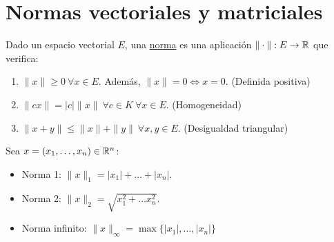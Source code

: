 \section{Normas vectoriales y matriciales}
\begin{definicion}[Norma]
    Dado un espacio vectorial $E$, una \underline{norma} es una aplicación $\|\cdot\|:E \rightarrow \mathbb R$ que verifica:
    \begin{enumerate}
        \item $\|x\|\geq 0 \ \forall x \in E$. Además, $\|x\|=0 \Leftrightarrow x=0$. (Definida positiva)
        \item $\|cx\|=|c|\|x\| \ \forall c \in K~\forall x \in E$. (Homogeneidad)
        \item $\|x+y\|\leq \|x\|+\|y\| \ \forall x,y \in E$. (Desigualdad triangular)
    \end{enumerate}
\end{definicion}
\bigskip
\begin{ejemplo}
    Sea $x=(x_1, \ldots, x_n) \in \mathbb R^n$:
    \begin{itemize}
        \item Norma 1: $\|x\|_1 = |x_1| + \ldots + |x_n|$.
        \item Norma 2: $\|x\|_2 = \sqrt{x_1^2 + \ldots x_n^2}$.
        \item Norma infinito: $\|x\|_\infty = \max\{|x_1|, \ldots, |x_n|\}$
    \end{itemize}
\end{ejemplo}

